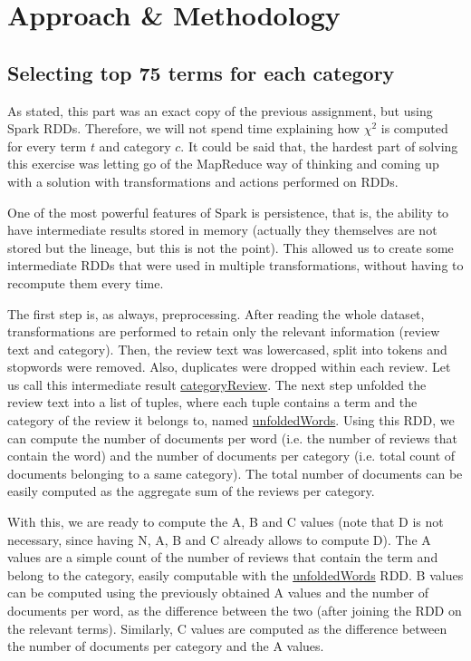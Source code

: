 \documentclass[11pt]{article}
\begin{document}
\section{Approach \& Methodology}

\subsection{Selecting top 75 terms for each category}

As stated, this part was an exact copy of the previous assignment, but using Spark RDDs. Therefore, we will not spend time explaining how $\chi^2$ is computed for every term $t$ and category $c$. It could be said that, the hardest part of solving this exercise was letting go of the MapReduce way of thinking and coming up with a solution with transformations and actions performed on RDDs.

One of the most powerful features of Spark is persistence, that is, the ability to have intermediate results stored in memory (actually they themselves are not stored but the lineage, but this is not the point). This allowed us to create some intermediate RDDs that were used in multiple transformations, without having to recompute them every time.

The first step is, as always, preprocessing. After reading the whole dataset, transformations are performed to retain only the relevant information (review text and category). Then, the review text was lowercased, split into tokens and stopwords were removed. Also, duplicates were dropped within each review. Let us call this intermediate result \underline{categoryReview}. The next step unfolded the review text into a list of tuples, where each tuple contains a term and the category of the review it belongs to, named \underline{unfoldedWords}. Using this RDD, we can compute the number of documents per word (i.e. the number of reviews that contain the word) and the number of documents per category (i.e. total count of documents belonging to a same category). The total number of documents can be easily computed as the aggregate sum of the reviews per category.

With this, we are ready to compute the A, B and C values (note that D is not necessary, since having N, A, B and C already allows to compute D). The A values are a simple count of the number of reviews that contain the term and belong to the category, easily computable with the \underline{unfoldedWords} RDD. B values can be computed using the previously obtained A values and the number of documents per word, as the difference between the two (after joining the RDD on the relevant terms). Similarly, C values are computed as the difference between the number of documents per category and the A values.
\end{document}
